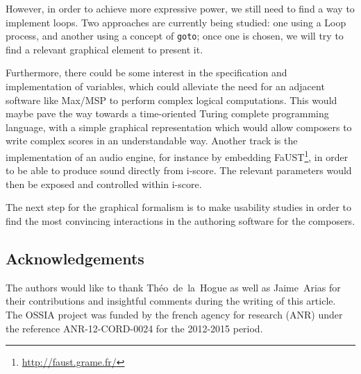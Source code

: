 \documentclass{article}
\begin{document}
	However, in order to achieve more expressive power, we still need to find a way to implement loops. Two approaches are currently being studied: one using a Loop process, and another using a concept of \texttt{goto}; once one is chosen, we will try to find a relevant graphical element to present it.
	
	Furthermore, there could be some interest in the specification and implementation of variables, which could alleviate the need for an adjacent software like Max/MSP to perform complex logical computations. This would maybe pave the way towards a time-oriented Turing complete programming language, with a simple graphical representation which would allow composers to write complex scores in an understandable way.
	Another track is the implementation of an audio engine, for instance by embedding FaUST\footnote{\url{http://faust.grame.fr/}}, in order to be able to produce sound directly from i-score. The relevant parameters would then be exposed and controlled within i-score.
	
	The next step for the graphical formalism is to make usability studies in order to find the most convincing interactions in the authoring software for the composers.
	
	\subsection*{Acknowledgements}
	The authors would like to thank Théo~de~la~Hogue as well as Jaime~Arias for their contributions and insightful comments during the writing of this article. The OSSIA project was funded by the french agency for research (ANR) under the reference ANR-12-CORD-0024 for the 2012-2015 period.
	
	
	
\end{document}
